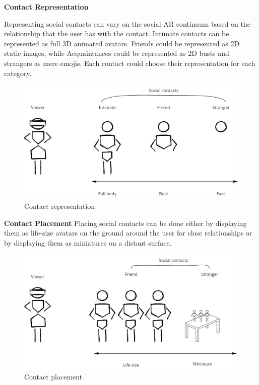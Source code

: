 \textbf{Contact Representation}

Representing social contacts can vary on the social AR continuum based on the relationship that the user has with the contact. Intimate contacts can be represented as full 3D animated avatars. Friends could be represented as 2D static images, while Acquaintances could be represented as 2D busts and strangers as mere emojis. Each contact could choose their representation for each category.  

\begin{figure}[h]
    \centering
    \includegraphics[width=.8\linewidth]{images/Continuum-representation.jpg}
    \caption{Contact representation}
    \label{fig:continuum:contact-representations}
\end{figure}


\textbf{Contact Placement}
Placing social contacts can be done either by displaying them as life-size avatars on the ground around the user for close relationships or by displaying them as miniatures on a distant surface. 

\begin{figure}[h]
    \centering
    \includegraphics[width=.8\linewidth]{images/Continuum-placement.jpg}
    \caption{Contact placement}
    \label{fig:continuum:contact-placement}
\end{figure}

